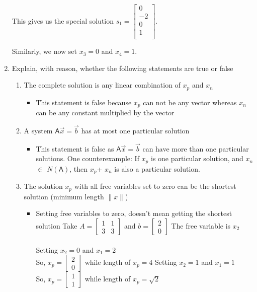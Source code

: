 \documentclass[a4paper, 11pt]{article}
\newcommand{\mat}[1]{\boldsymbol { \mathsf{#1}} }
\begin{document}
\begin{enumerate}
This gives us the special solution $s_1 = \begin{bmatrix}
       0 \\
       -2 \\
       0 \\
       1 \\
\end{bmatrix}$.

Similarly, we now set $x_3 = 0$ and $x_4 = 1$.

\item Explain, with reason, whether the following statements are true or false

\begin{enumerate}[label=(\alph*)]
\item The complete solution is any linear combination of $x_p$ and $x_n$
\begin{itemize}
    \item 
    This statement is false because $x_p$ can not be any vector whereas $x_n$ can be any constant multiplied by the vector
\end{itemize}
\item A system $\mat A \vec x = \vec b$ has at most one particular solution
\begin{itemize}
    \item
    This statement is false as $\mat A \vec x = \vec b$ can have more than one particular solutions.
    One counterexample: If $x_p$ is one particular solution, and  $x_n$ $\in$ $N( \mat A) $, then $x_p$+ $x_n$ is also a particular solution.
\end{itemize}
\item The solution $x_p$ with all free variables set to zero can be the shortest solution (minimum length $\|x\|$)

\begin{itemize}
    \item
    Setting free variables to zero, doesn't mean getting the shortest solution
    Take    $ A = \begin{bmatrix}
    1 & 1 \\ 3 & 3
    \end{bmatrix}$
    and $ b  = \begin{bmatrix}
    2  \\ 0
    \end{bmatrix}$
    The free variable is $x_2$
    \\ 
    \\
    Setting $x_2 = 0$ and $x_1=2$\\
    So, $x_p =\begin{bmatrix}
    2  \\ 0
    \end{bmatrix}$
    while length of $x_p = 4$
    \newline        Setting $x_2 = 1 $ and $x_1=1$\\
    So, $x_p =\begin{bmatrix}
    1 \\ 1
    \end{bmatrix}$
    while length of $x_p = \sqrt{2}$
    

\end{itemize}
\end{enumerate}
\end{enumerate}
\end{document}
